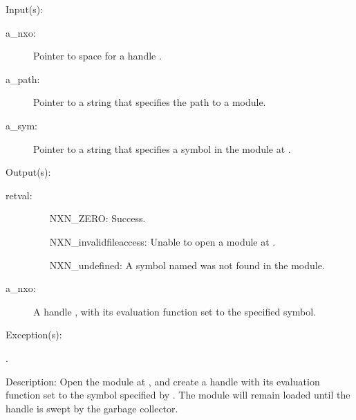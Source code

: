 \begin{capi}
\label{nxm_new}
	\begin{capilist}
	\item[Input(s): ]
		\begin{description}\item[]
		\item[a\_nxo: ]
			Pointer to space for a handle .
		\item[a\_path: ]
			Pointer to a string  that specifies the
			path to a module.
		\item[a\_sym: ]
			Pointer to a string  that specifies a
			symbol in the module at .
		\end{description}
	\item[Output(s): ]
		\begin{description}\item[]
		\item[retval: ]
			\begin{enumerate}
			\item[NXN\_ZERO: ] Success.
			\item[NXN\_invalidfileaccess: ]
				Unable to open a module at .
			\item[NXN\_undefined: ]
				A symbol named  was not found in
				the module.
			\end{enumerate}
		\item[a\_nxo: ]
			A handle , with its evaluation function
			set to the specified symbol.
		\end{description}
	\item[Exception(s): ]
		\begin{description}\item[]
		\item[.]
		\end{description}
	\item[Description: ]
		Open the module at , and create a handle with its
		evaluation function set to the symbol specified by
		.  The module will remain loaded until the handle
		 is swept by the garbage collector.
	\end{capilist}
\label{nxm_iter_get}
	\begin{capilist}

\end{capilist}
\end{capi}
